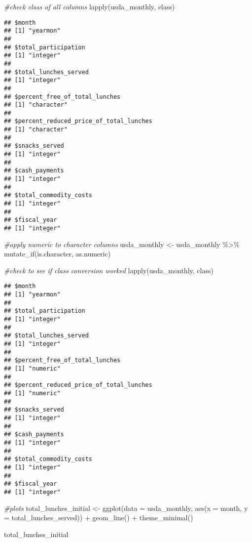 \documentclass[
]{article}
\newenvironment{Shaded}{\begin{snugshade}}{\end{snugshade}}
\newcommand{\AttributeTok}[1]{\textcolor[rgb]{0.77,0.63,0.00}{#1}}
\newcommand{\CommentTok}[1]{\textcolor[rgb]{0.56,0.35,0.01}{\textit{#1}}}
\newcommand{\FunctionTok}[1]{\textcolor[rgb]{0.00,0.00,0.00}{#1}}
\newcommand{\NormalTok}[1]{#1}
\newcommand{\OtherTok}[1]{\textcolor[rgb]{0.56,0.35,0.01}{#1}}
\newcommand{\SpecialCharTok}[1]{\textcolor[rgb]{0.00,0.00,0.00}{#1}}
\begin{document}
\begin{Shaded}
\begin{Highlighting}[]
\CommentTok{\#check class of all columns}
\FunctionTok{lapply}\NormalTok{(usda\_monthly, class)}
\end{Highlighting}
\end{Shaded}

\begin{verbatim}
## $month
## [1] "yearmon"
## 
## $total_participation
## [1] "integer"
## 
## $total_lunches_served
## [1] "integer"
## 
## $percent_free_of_total_lunches
## [1] "character"
## 
## $percent_reduced_price_of_total_lunches
## [1] "character"
## 
## $snacks_served
## [1] "integer"
## 
## $cash_payments
## [1] "integer"
## 
## $total_commodity_costs
## [1] "integer"
## 
## $fiscal_year
## [1] "integer"
\end{verbatim}

\begin{Shaded}
\begin{Highlighting}[]
\CommentTok{\#apply numeric to character columns}
\NormalTok{usda\_monthly }\OtherTok{\textless{}{-}}\NormalTok{ usda\_monthly }\SpecialCharTok{\%\textgreater{}\%} 
  \FunctionTok{mutate\_if}\NormalTok{(is.character, as.numeric)}

\CommentTok{\#check to see if class conversion worked }
\FunctionTok{lapply}\NormalTok{(usda\_monthly, class)}
\end{Highlighting}
\end{Shaded}

\begin{verbatim}
## $month
## [1] "yearmon"
## 
## $total_participation
## [1] "integer"
## 
## $total_lunches_served
## [1] "integer"
## 
## $percent_free_of_total_lunches
## [1] "numeric"
## 
## $percent_reduced_price_of_total_lunches
## [1] "numeric"
## 
## $snacks_served
## [1] "integer"
## 
## $cash_payments
## [1] "integer"
## 
## $total_commodity_costs
## [1] "integer"
## 
## $fiscal_year
## [1] "integer"
\end{verbatim}

\begin{Shaded}
\begin{Highlighting}[]
\CommentTok{\#plots }
\NormalTok{total\_lunches\_initial }\OtherTok{\textless{}{-}} \FunctionTok{ggplot}\NormalTok{(}\AttributeTok{data =}\NormalTok{ usda\_monthly, }\FunctionTok{aes}\NormalTok{(}\AttributeTok{x =}\NormalTok{ month, }\AttributeTok{y =}\NormalTok{ total\_lunches\_served)) }\SpecialCharTok{+}
  \FunctionTok{geom\_line}\NormalTok{() }\SpecialCharTok{+}
  \FunctionTok{theme\_minimal}\NormalTok{()}

\NormalTok{total\_lunches\_initial}
\end{Highlighting}
\end{Shaded}
\end{document}
